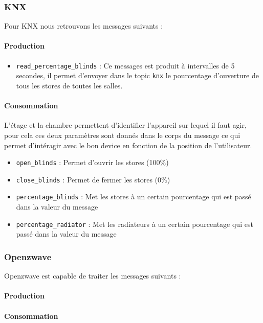 \subsubsection{KNX}
Pour KNX nous retrouvons les messages suivants : 
\paragraph{Production}
\begin{itemize}
    \item \texttt{read_percentage_blinds} : Ce messages est produit à intervalles de 5 secondes, il permet d'envoyer dans le topic \texttt{knx} le pourcentage d'ouverture de tous les stores de toutes les salles. 
\end{itemize}

\paragraph{Consommation}
L'étage et la chambre permettent d'identifier l'appareil sur lequel il faut agir, pour cela ces deux paramètres sont donnés dans le corps du message ce qui permet d'intéragir avec le bon device en fonction de la position de l'utilisateur.
\begin{itemize}
    \item \texttt{open_blinds} : Permet d'ouvrir les stores (100\%)
    \item \texttt{close_blinds} : Permet de fermer les stores (0\%)
    \item \texttt{percentage_blinds} : Met les stores à un certain pourcentage qui est passé dans la valeur du message
    \item \texttt{percentage_radiator} : Met les radiateurs à un certain pourcentage qui est passé dans la valeur du message
\end{itemize}

\subsubsection{Openzwave}
Openzwave est capable de traiter les messages suivants : 
\paragraph{Production}
\paragraph{Consommation}

